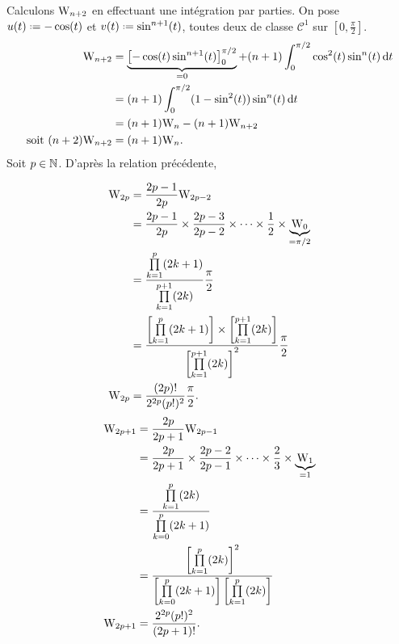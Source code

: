\begin{preuve}
    Calculons $\mathrm{W}_{n+2}$ en effectuant une intégration par parties. On pose $u(t) \defeq - \cos(t)$ et $v(t) \defeq \sin^{n+1}(t)$, toutes deux de classe $\mathscr{C}^1$ sur $\left[0, \frac{\pi}{2} \right]$. 
    \begin{align*}
        \mathrm{W}_{n+2} &= \underbrace{\left[ -\cos(t) \sin^{n+1}(t) \right]_0^{\pi/2}}_{=0} + (n+1) \int_0^{\pi/2} \cos^2 (t) \sin^n(t) \, \mathrm{d} t \\
        &= (n+1) \int_0^{\pi/2} (1 - \sin^2(t)) \sin^n(t) \, \mathrm{d} t \\
        &= (n+1) \mathrm{W}_n - (n+1) \mathrm{W}_{n+2} \\
        \text{soit } (n+2) \mathrm{W}_{n+2} &= (n+1) \mathrm{W}_n.
\end{align*}
Soit $p \in \mathbb{N}$. D'après la relation précédente, 
\begin{figure*}[h!]
\begin{multicols}{2}
\begin{align*}
    \mathrm{W}_{2p} &= \frac{2p-1}{2p} \mathrm{W}_{2p-2} \\
    &= \frac{2p-1}{2p} \times \frac{2p-3}{2p-2} \times \cdots \times \frac{1}{2} \times \underbrace{\mathrm{W}_0}_{=\pi/2} \\
    &= \frac{\prod\limits_{k=1}^p (2k+1)}{\prod\limits_{k=1}^{p+1} (2k)} \frac{\pi}{2} \\
    &= \frac{\left[\prod\limits_{k=1}^p (2k+1) \right] \times \left[ \prod\limits_{k=1}^{p+1} (2k) \right]}{\left[\prod\limits_{k=1}^{p+1} (2k) \right]^2} \frac{\pi}{2} \\
    \mathrm{W}_{2p} &= \frac{(2p)!}{2^{2p}(p!)^2} \frac{\pi}{2}.
\end{align*}
\begin{align*}
    \mathrm{W}_{2p+1} &= \frac{2p}{2p+1} \mathrm{W}_{2p-1} \\
    &= \frac{2p}{2p+1} \times \frac{2p-2}{2p-1} \times \cdots \times \frac{2}{3} \times \underbrace{\mathrm{W}_1}_{=1} \\
    &= \frac{\prod\limits_{k=1}^p (2k)}{\prod\limits_{k=0}^p (2k+1)} \\
    &= \frac{\left[ \prod\limits_{k=1}^p (2k) \right]^2}{\left[ \prod\limits_{k=0}^p (2k+1) \right] \left[ \prod\limits_{k=1}^p (2k) \right]} \\
    \mathrm{W}_{2p+1} &= \frac{2^{2p}(p!)^2}{(2p+1)!}.
\end{align*}
\end{multicols}
\end{figure*}
\end{preuve}

